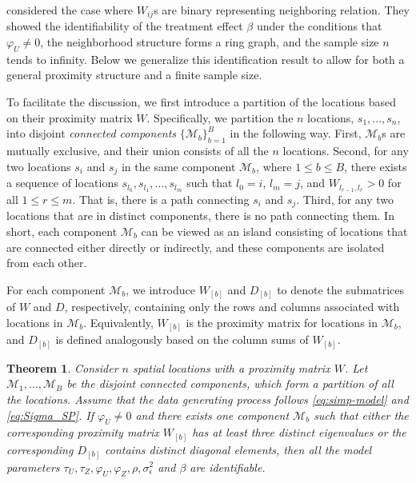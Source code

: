 \documentclass[11pt]{article}
\newtheorem{theorem}{Theorem}
\theoremstyle{definition}
\theoremstyle{remark}
\begin{document}
\citet{schnell2020mitigating} considered the case where $W_{ij}$s are binary representing neighboring relation. They showed the identifiability of the treatment effect $\beta$ under the conditions that $\varphi_U \ne 0$, the neighborhood structure forms a ring graph, and the sample size $n$ tends to infinity.
Below we generalize this identification result to 
allow for both a general proximity structure 
and a finite sample size. 


To facilitate the discussion, we first introduce a partition of the locations based on their proximity matrix $W$. 
Specifically, we partition the $n$ locations, $s_1,...,s_n$, into disjoint \emph{connected components} $\{\mathcal{M}_b\}_{b=1}^B$ in the following way. 
First, $\mathcal{M}_b$s are mutually exclusive, and their union consists of all the $n$ locations. 
Second, for any two locations $s_i$ and $s_j$ in the same component $\mathcal{M}_b$, where $1\le b \le B$, 
there exists a sequence of locations $s_{l_0}, s_{l_1}, \ldots, s_{l_m}$ such that $l_0 = i$, $l_m = j$, and $W_{l_{r-1}, l_{r}}>0$ for all $1\le r\le m$. 
That is, there is a path connecting $s_i$ and $s_j$. 
Third, for any two locations that are in distinct components, there is no path connecting them. 
In short, each component $\mathcal{M}_b$ can be viewed as an island consisting of locations that are connected either directly or indirectly, and these components are isolated from each other. 


For each component $\mathcal{M}_b$, we introduce $W_{[b]}$ and $D_{[b]}$ to denote the submatrices of $W$ and $D$, respectively, containing only the rows and columns associated with locations in $\mathcal{M}_b$. Equivalently, $W_{[b]}$ is the proximity matrix for locations in $\mathcal{M}_b$, and $D_{[b]}$ is defined analogously based on the column sums of $W_{[b]}$. 


\begin{theorem}\label{thm:car-identifiability}
Consider $n$ spatial locations with a proximity matrix $W$. 
Let 
$\mathcal{M}_1,...,\mathcal{M}_B$ be the disjoint connected components, which form a partition of all the locations. 
Assume that the data generating process follows \eqref{eq:simp-model} and \eqref{eq:Sigma_SP}. 
If $\varphi_U
\neq
0$ and there exists one component $\mathcal{M}_b$ such that 
either the corresponding proximity matrix $W_{[b]}$ has at least three distinct eigenvalues or the corresponding $D_{[b]}$ contains distinct diagonal elements, then all the model parameters $\tau_U, \tau_Z, \varphi_U, \varphi_Z, \rho, \sigma_\epsilon^2$ and $\beta$ are identifiable. 
\end{theorem}
\end{document}

